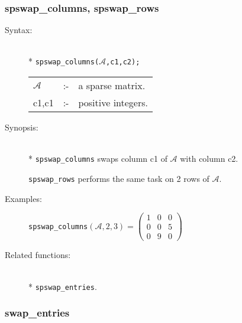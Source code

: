 \subsubsection{spswap\_columns, spswap\_rows}
\label{sparse:spswap_columns}

\begin{description}
\item[Syntax:]\mbox{}\\*
\texttt{spswap\_columns($\mathcal{A}$,c1,c2);}\\[2mm]
\begin{tabular}{l l l}
$\mathcal{A}$ &:-& a sparse matrix. \\
c1,c1      &:-& positive integers.
\end{tabular}

\item[Synopsis:]\mbox{}\\*
\texttt{spswap\_columns} swaps column c1 of $\mathcal{A}$ with column c2.

\texttt{spswap\_rows} performs the same task on 2 rows of
                $\mathcal{A}$.

\item[Examples:]
\begin{flushleft}
\texttt{spswap\_columns}\((\mathcal{A},2,3) =
        \begin{pmatrix} 1 & 0 & 0 \\ 0 & 0 & 5 \\ 0 & 9 & 0 \end{pmatrix}
\)
\end{flushleft}

\item[Related functions:]\mbox{}\\*
\texttt{spswap\_entries}.
\end{description}

\subsubsection{swap\_entries}
\label{sparse:spadd_entries}

